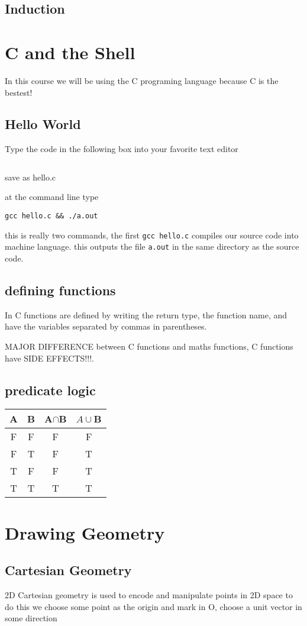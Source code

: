\subsection{Induction}

\section{C and the Shell}
    In this course we will be using the C programing language because C is the bestest!
\subsection{Hello World}
    Type the code in the following box into your favorite text editor
\inputminted{c}{hello.c}
    save as hello.c

    at the command line type

    \texttt{gcc hello.c \&\& ./a.out}

    this is really two commands, the first \texttt{gcc hello.c} compiles our source code into
    machine language. this outputs the file \texttt{a.out} in the same directory as the 
    source code.
\subsection{defining functions}
    In C functions are defined by writing the return type, the function name, and have 
    the variables separated by commas in parentheses.

    MAJOR DIFFERENCE between C functions and maths functions, C functions have SIDE EFFECTS!!!.
\subsection{predicate logic}
    \begin{tabular}{| c  c|| c c |}
        A & B & A$\cap$B & $A\cup$B\\
        \hline
        F & F & F & F     \\
        F & T & F & T     \\
        T & F & F & T     \\
        T & T & T & T     \\
    \end{tabular}

\section{Drawing Geometry}
\subsection{Cartesian Geometry}
    2D Cartesian geometry is used to encode and manipulate points in 2D space
    to do this we choose some point as the origin and mark in O, choose a unit 
    vector in some direction 

